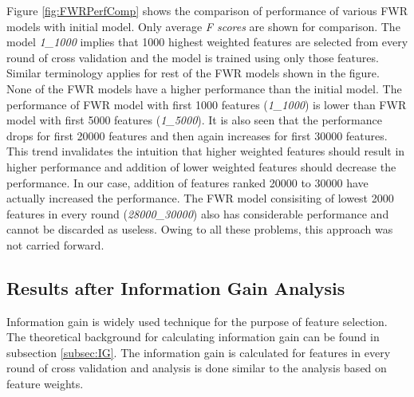 Figure \ref{fig:FWRPerfComp} shows the comparison of performance of various FWR models with initial model. Only average \textit{F scores} are shown for comparison. The model \textit{1\_1000} implies that 1000 highest weighted features are selected from every round of cross validation and the model is trained using only those features. Similar terminology applies for rest of the FWR models shown in the figure. None of the FWR models have a higher performance than the initial model. The performance of FWR model with first 1000 features (\textit{1\_1000}) is lower than FWR model with first 5000 features (\textit{1\_5000}). It is also seen that the performance drops for first 20000 features and then again increases for first 30000 features. This trend invalidates the intuition that higher weighted features should result in higher performance and addition of lower weighted features should decrease the performance. In our case, addition of features ranked 20000 to 30000 have actually increased the performance. The FWR model consisiting of lowest 2000 features in every round (\textit{28000\_30000}) also has considerable performance and cannot be discarded as useless. Owing to all these problems, this approach was not carried forward.
 
\subsection{Results after Information Gain Analysis}

Information gain is widely used technique for the purpose of feature selection. The theoretical background for calculating information gain can be found in subsection \ref{subsec:IG}. The information gain is calculated for features in every round of cross validation and analysis is done similar to the analysis based on feature weights.

